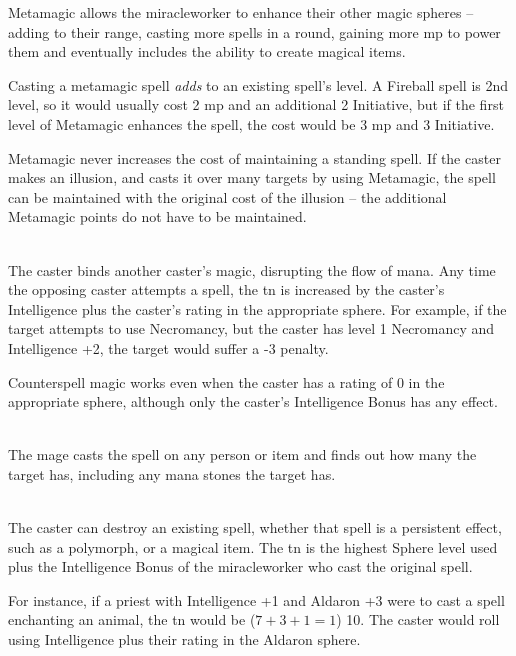 \documentclass[titlepage,a4paper,openany]{book}
\begin{document}
\begin{multicols}{2}


Metamagic allows the \gls{miracleworker} to enhance their other magic spheres -- adding to their range, casting more spells in a \gls{round}, gaining more \gls{mp} to power them and eventually includes the ability to create magical items.

Casting a metamagic spell \emph{adds} to an existing spell's level.  A Fireball spell is 2nd level, so it would usually cost 2 \gls{mp} and an additional 2 Initiative, but if the first level of Metamagic enhances the spell, the cost would be 3 \gls{mp} and 3 Initiative.

Metamagic never increases the cost of maintaining a standing spell.
If the caster makes an illusion, and casts it over many targets by using Metamagic, the spell can be maintained with the original cost of the illusion -- the additional Metamagic points do not have to be maintained.

\spelllevel

\\
The caster binds another caster's magic, disrupting the flow of mana.  Any time the opposing caster attempts a spell, the \gls{tn} is increased by the caster's Intelligence plus the caster's rating in the appropriate sphere.  For example, if the target attempts to use Necromancy, but the caster has level 1 Necromancy and Intelligence +2, the target would suffer a -3 penalty.

Counterspell magic works even when the caster has a rating of 0 in the appropriate sphere, although only the caster's Intelligence Bonus has any effect.

\\
The mage casts the spell on any person or item and finds out how many  the target has, including any mana stones the target has.

\\
The caster can destroy an existing spell, whether that spell is a persistent effect, such as a polymorph, or a magical item.  The \gls{tn} is the highest Sphere level used plus the Intelligence Bonus of the \gls{miracleworker} who cast the original spell.

For instance, if a priest with Intelligence +1 and Aldaron +3 were to cast a spell enchanting an animal, the \gls{tn} would be ($7+3+1=1$) 10.  The caster would roll using Intelligence plus their rating in the Aldaron sphere.


\end{multicols}
\end{document}
